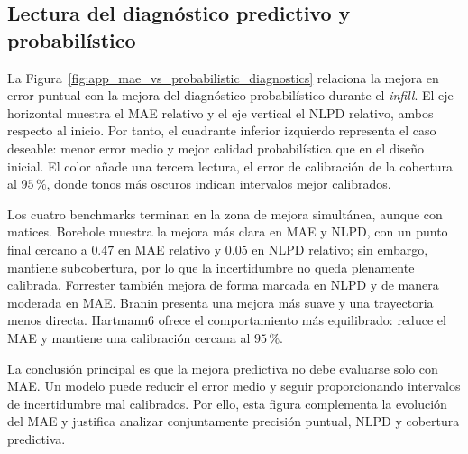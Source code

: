 
\subsection*{Lectura del diagnóstico predictivo y probabilístico}

La Figura~\ref{fig:app_mae_vs_probabilistic_diagnostics} relaciona la mejora en error puntual con la mejora del diagnóstico probabilístico durante el \emph{infill}. El eje horizontal muestra el MAE relativo y el eje vertical el NLPD relativo, ambos respecto al inicio. Por tanto, el cuadrante inferior izquierdo representa el caso deseable: menor error medio y mejor calidad probabilística que en el diseño inicial. El color añade una tercera lectura, el error de calibración de la cobertura al \(95\,\%\), donde tonos más oscuros indican intervalos mejor calibrados.

Los cuatro benchmarks terminan en la zona de mejora simultánea, aunque con matices. Borehole muestra la mejora más clara en MAE y NLPD, con un punto final cercano a \(0.47\) en MAE relativo y \(0.05\) en NLPD relativo; sin embargo, mantiene subcobertura, por lo que la incertidumbre no queda plenamente calibrada. Forrester también mejora de forma marcada en NLPD y de manera moderada en MAE. Branin presenta una mejora más suave y una trayectoria menos directa. Hartmann6 ofrece el comportamiento más equilibrado: reduce el MAE y mantiene una calibración cercana al \(95\,\%\).

La conclusión principal es que la mejora predictiva no debe evaluarse solo con MAE. Un modelo puede reducir el error medio y seguir proporcionando intervalos de incertidumbre mal calibrados. Por ello, esta figura complementa la evolución del MAE y justifica analizar conjuntamente precisión puntual, NLPD y cobertura predictiva.
